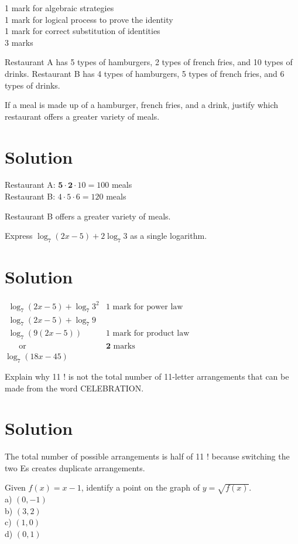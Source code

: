 \documentclass[10pt]{article}
\begin{document}
1 mark for algebraic strategies\\
1 mark for logical process to prove the identity\\
1 mark for correct substitution of identities\\
3 marks

Restaurant A has 5 types of hamburgers, 2 types of french fries, and 10 types of drinks. Restaurant B has 4 types of hamburgers, 5 types of french fries, and 6 types of drinks.

If a meal is made up of a hamburger, french fries, and a drink, justify which restaurant offers a greater variety of meals.

\section*{Solution}
Restaurant A: $\mathbf{5} \cdot \mathbf{2} \cdot 10=100$ meals\\
Restaurant B: $4 \cdot 5 \cdot 6=120$ meals

Restaurant B offers a greater variety of meals.

Express $\log _{7}(2 x-5)+2 \log _{7} 3$ as a single logarithm.

\section*{Solution}
$\begin{array}{ll}\log _{7}(2 x-5)+\log _{7} 3^{2} & 1 \text { mark for power law } \\ \log _{7}(2 x-5)+\log _{7} 9 & \\ \log _{7}(9(2 x-5)) & 1 \text { mark for product law } \\ \quad \text { or } & \mathbf{2} \text { marks }\end{array}$\\
$\log _{7}(18 x-45)$

Explain why 11 ! is not the total number of 11-letter arrangements that can be made from the word CELEBRATION.

\section*{Solution}
The total number of possible arrangements is half of 11 ! because switching the two Es creates duplicate arrangements.

Given $f(x)=x-1$, identify a point on the graph of $y=\sqrt{f(x)}$.\\
a) $(0,-1)$\\
b) $(3,2)$\\
c) $(1,0)$\\
d) $(0,1)$
\end{document}
